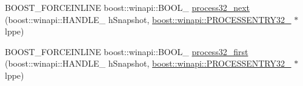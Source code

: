 \begin{DoxyCompactItemize}
\item 
B\+O\+O\+S\+T\+\_\+\+F\+O\+R\+C\+E\+I\+N\+L\+I\+NE boost\+::winapi\+::\+B\+O\+O\+L\+\_\+ \mbox{\hyperlink{namespaceboost_1_1winapi_a931768aa879bcce18336898dedd69efc}{process32\+\_\+next}} (boost\+::winapi\+::\+H\+A\+N\+D\+L\+E\+\_\+ h\+Snapshot, \mbox{\hyperlink{namespaceboost_1_1winapi_aa148b1a2cd4a16c95b05b56d8b31cc4c}{boost\+::winapi\+::\+P\+R\+O\+C\+E\+S\+S\+E\+N\+T\+R\+Y32\+\_\+}} $\ast$lppe)
\item 
B\+O\+O\+S\+T\+\_\+\+F\+O\+R\+C\+E\+I\+N\+L\+I\+NE boost\+::winapi\+::\+B\+O\+O\+L\+\_\+ \mbox{\hyperlink{namespaceboost_1_1winapi_a377ad6e592ef538339b1f1f293bb0816}{process32\+\_\+first}} (boost\+::winapi\+::\+H\+A\+N\+D\+L\+E\+\_\+ h\+Snapshot, \mbox{\hyperlink{namespaceboost_1_1winapi_aa148b1a2cd4a16c95b05b56d8b31cc4c}{boost\+::winapi\+::\+P\+R\+O\+C\+E\+S\+S\+E\+N\+T\+R\+Y32\+\_\+}} $\ast$lppe)
\end{DoxyCompactItemize}
